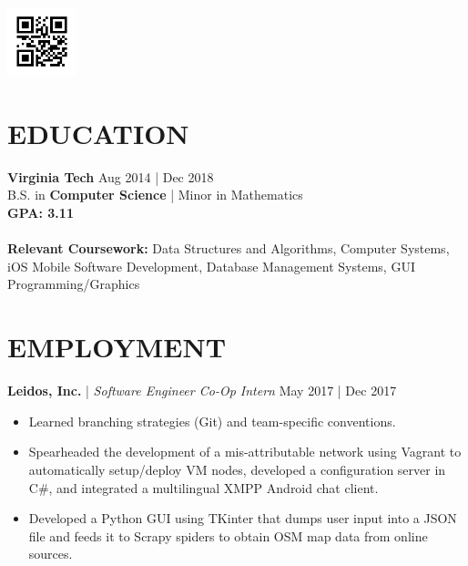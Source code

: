 \documentclass[line,margin]{res}
\begin{document}
 \\ 
\includegraphics[width=2cm,height=2cm]{images/static_qr_code_without_logo.jpg} \\
\address{randy8@vt.edu | (571) 296-6786 | github.com/randy8 }
\begin{resume} 
	\vspace{-5mm}
	\section{EDUCATION}
	\textbf{Virginia Tech} \hfill Aug 2014 | Dec 2018\\ B.S. in \textbf{Computer Science} | Minor in Mathematics  \\ \textbf{GPA: 3.11} \\
	\\ \textbf{Relevant Coursework:} Data Structures and Algorithms, Computer Systems, iOS Mobile Software Development, Database Management Systems, GUI Programming/Graphics
	\section{EMPLOYMENT}
	\textbf{Leidos, Inc.} | {\sl Software Engineer Co-Op Intern} \hfill May 2017 | Dec 2017 
	\begin{itemize} 
		\item Learned branching strategies (Git) and team-specific conventions.
		\item Spearheaded the development of a mis-attributable network  using Vagrant to automatically setup/deploy VM nodes, developed a configuration server in C\#, and integrated a multilingual XMPP Android chat client.
		\item Developed a Python GUI using TKinter that dumps user input into a JSON file and feeds it to Scrapy spiders to obtain OSM map data from online sources.
	\end{itemize}

\end{resume}
\end{document}
